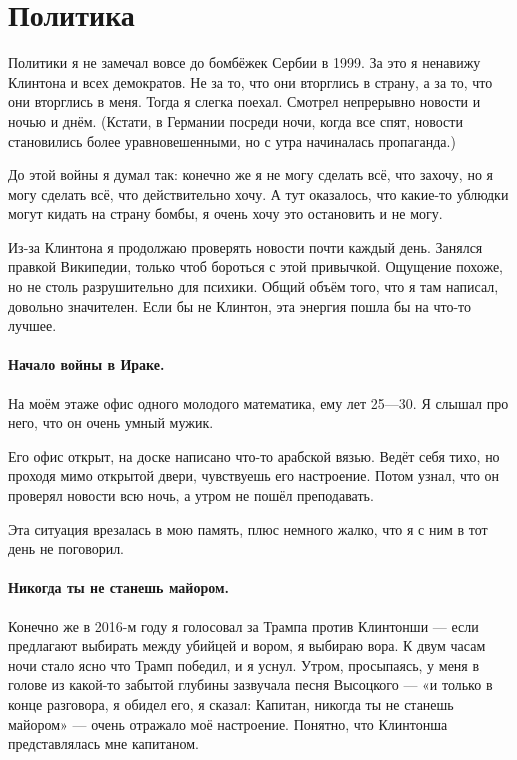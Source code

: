 \documentclass{book}
\begin{document}
\section*{Политика}

Политики я не замечал вовсе до бомбёжек Сербии в 1999.
За это я ненавижу Клинтона и всех демократов.
Не за то, что они вторглись в страну, а за то, что они вторглись в меня.
Тогда я слегка поехал.
Смотрел непрерывно новости и ночью и днём.
(Кстати, в Германии посреди ночи, когда все спят, новости становились более уравновешенными, но с утра начиналась пропаганда.)

До этой войны я думал так: конечно же я не могу сделать всё, что захочу, но я могу сделать всё, что действительно хочу.
А тут оказалось, что какие-то ублюдки могут кидать на страну бомбы, я очень хочу это остановить и не могу.

Из-за Клинтона я продолжаю проверять новости почти каждый день.
Занялся правкой Википедии, только чтоб бороться с этой привычкой.
Ощущение похоже, но не столь разрушительно для психики.
Общий объём того, что я там написал, довольно значителен.
Если бы не Клинтон, эта энергия пошла бы на что-то лучшее.

\paragraph{Начало войны в Ираке.}
На моём этаже офис одного молодого математика, ему лет 25---30.
Я слышал про него, что он очень умный мужик.

Его офис открыт, на доске написано что-то арабской вязью.
Ведёт себя тихо, но проходя мимо открытой двери, чувствуешь его настроение.
Потом узнал, что он проверял новости всю ночь,
а утром не пошёл преподавать.

Эта ситуация врезалась в мою память, плюс немного жалко, что я с ним в тот день не поговорил.

\paragraph{Никогда ты не станешь майором.}
Конечно же в 2016-м году я голосовал за Трампа против Клинтонши --- если предлагают выбирать между убийцей и вором, я выбираю вора.
К двум часам ночи стало ясно что Трамп победил, и я уснул.
Утром, просыпаясь, у меня в голове из какой-то забытой глубины зазвучала песня Высоцкого --- «и только в конце разговора, я обидел его, я сказал: Капитан, никогда ты не станешь майором» --- очень отражало моё настроение.
Понятно, что Клинтонша представлялась мне капитаном.
\end{document}

